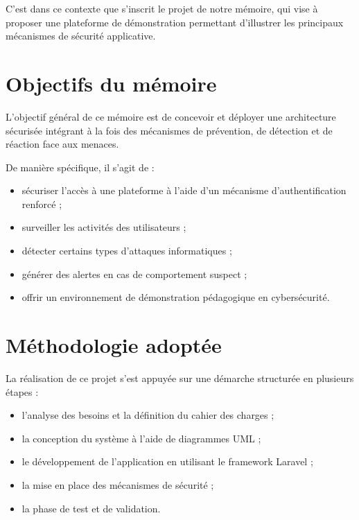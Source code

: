 \documentclass[a4paper,12pt]{report}
\begin{document}
    C’est dans ce contexte que s’inscrit le projet de notre mémoire, qui vise à proposer une plateforme de démonstration permettant d’illustrer les principaux mécanismes de sécurité applicative.
    
    \section{Objectifs du mémoire}
    
    L'objectif général de ce mémoire est de concevoir et déployer une architecture sécurisée intégrant à la fois des mécanismes de prévention, de détection et de réaction face aux menaces.
    
    De manière spécifique, il s'agit de :
    
    \begin{itemize}
         \item sécuriser l’accès à une plateforme à l’aide d’un mécanisme d’authentification renforcé ;
        \item surveiller les activités des utilisateurs ;
        \item détecter certains types d’attaques informatiques ;
        \item générer des alertes en cas de comportement suspect ;
        \item offrir un environnement de démonstration pédagogique en cybersécurité.
    \end{itemize}
    
    \section{Méthodologie adoptée}
    
    La réalisation de ce projet s’est appuyée sur une démarche structurée en plusieurs étapes :
    
    \begin{itemize}
        \item l’analyse des besoins et la définition du cahier des charges ;
        \item la conception du système à l’aide de diagrammes UML ;
        \item le développement de l’application en utilisant le framework Laravel ;
        \item la mise en place des mécanismes de sécurité ;
        \item la phase de test et de validation.
    \end{itemize}
    
\end{document}
